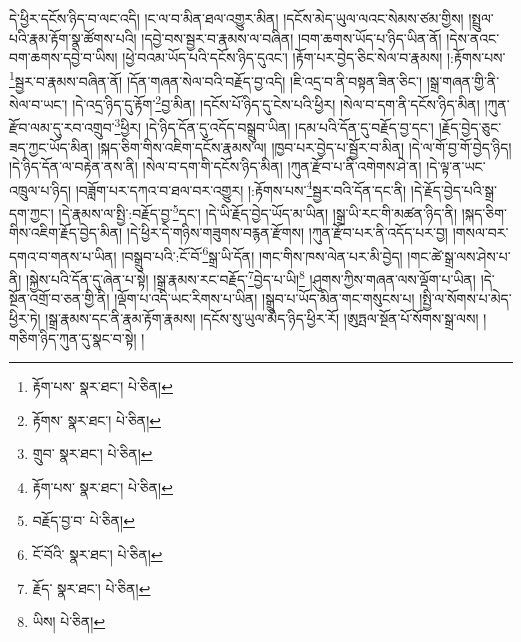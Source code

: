 དེ་ཕྱིར་དངོས་ཉིད་བ་ལང་འདི། །ང་ལ་བ་མིན་ཐལ་འགྱུར་མིན། །དངོས་མེད་ཡུལ་ལའང་སེམས་ཙམ་གྱིས། །སྤྲུལ་པའི་རྣམ་རྟོག་སྣ་ཚོགས་པའི། །དབྱེ་བས་སྦྱར་བ་རྣམས་ལ་བཞིན། །བག་ཆགས་ཡོད་པ་ཉིད་ཡིན་ནོ། །དེས་ནའང་བག་ཆགས་དབྱེ་བ་ཡིས། །ཕྱེ་བའམ་ཡོད་པའི་དངོས་ཉིད་དུའང་། །རྟོག་པར་བྱེད་ཅིང་སེལ་བ་རྣམས། །:རྟོགས་པས་\footnote{རྟོག་པས་  སྣར་ཐང་།  པེ་ཅིན། }སྦྱར་བ་རྣམས་བཞིན་ནོ། །དོན་གཞན་སེལ་བའི་བརྗོད་བྱ་འདི། །ཇི་འདྲ་བ་ནི་བསྟན་ཟིན་ཅིང་། །སྒྲ་གཞན་གྱི་ནི་སེལ་བ་ཡང་། །དེ་འདྲ་ཉིད་དུ་རྟོག་\footnote{རྟོགས་  སྣར་ཐང་།  པེ་ཅིན། }བྱ་མིན། །དངོས་པོ་ཉིད་དུ་ངེས་པའི་ཕྱིར། །སེལ་བ་དག་ནི་དངོས་ཉིད་མིན། །ཀུན་རྫོབ་ལམ་དུ་རབ་འགྲུབ་\footnote{གྲུབ་  སྣར་ཐང་།  པེ་ཅིན། }ཕྱིར། །དེ་ཉིད་དོན་དུ་འདོད་བསྒྲུབ་ཡིན། །དམ་པའི་དོན་དུ་བརྗོད་བྱ་དང་། །རྗོད་བྱེད་ཅུང་ཟད་ཀྱང་ཡོད་མིན། །སྐད་ཅིག་གིས་འཇིག་དངོས་རྣམས་ལ། །ཁྱབ་པར་བྱེད་པ་སྦྱོར་བ་མིན། །དེ་ལ་གོ་བྱ་གོ་བྱེད་ཉིད། །དེ་ཉིད་དོན་ལ་བརྟེན་ནས་ནི། །སེལ་བ་དག་གི་དངོས་ཉིད་མིན། །ཀུན་རྫོབ་པ་ནི་འགེགས་ཤེ་ན། །དེ་ལྟ་ན་ཡང་འཁྲུལ་པ་ཉིད། །བཟློག་པར་དཀའ་བ་ཐལ་བར་འགྱུར། །:རྟོགས་པས་\footnote{རྟོག་པས་  སྣར་ཐང་།  པེ་ཅིན། }སྦྱར་བའི་དོན་དང་ནི། །དེ་རྗོད་བྱེད་པའི་སྒྲ་དག་ཀྱང་། །དེ་རྣམས་ལ་སྤྱི་:བརྗོད་བྱ་\footnote{བརྗོད་བྱ་བ་  པེ་ཅིན། }དང་། །དེ་ཡི་རྗོད་བྱེད་ཡོད་མ་ཡིན། །སྒྲ་ཡི་རང་གི་མཚན་ཉིད་ནི། །སྐད་ཅིག་གིས་འཇིག་རྗོད་བྱེད་མིན། །དེ་ཕྱིར་དེ་གཉིས་གཟུགས་བརྙན་རྫོགས། །ཀུན་རྫོབ་པར་ནི་འདོད་པར་བྱ། །གསལ་བར་དགའ་བ་གནས་པ་ཡིན། །བསྒྲུབ་པའི་:ངོ་བོ་\footnote{ངོ་བོའི་  སྣར་ཐང་།  པེ་ཅིན། }སྒྲ་ཡི་དོན། །གང་གིས་ཁས་ལེན་པར་མི་བྱེད། །གང་ཚེ་སྒྲ་ལས་ཤེས་པ་ནི། །སྐྱེས་པའི་དོན་དུ་ཞེན་པ་སྟེ། །སྒྲ་རྣམས་རང་བརྗོད་\footnote{རྗོད་  སྣར་ཐང་།  པེ་ཅིན། }བྱེད་པ་ཡི།\footnote{ཡིས།  པེ་ཅིན། } །ཤུགས་ཀྱིས་གཞན་ལས་ལྡོག་པ་ཡིན། །དེ་སྔོན་འགྲོ་བ་ཅན་གྱི་ནི། །ལྡོག་པ་འདི་ཡང་རིགས་པ་ཡིན། །སྒྲུབ་པ་ཡོད་མིན་གང་གསུངས་པ། །སྤྱི་ལ་སོགས་པ་མེད་ཕྱིར་ཏེ། །སྒྲ་རྣམས་དང་ནི་རྣམ་རྟོག་རྣམས། །དངོས་སུ་ཡུལ་མེད་ཉིད་ཕྱིར་རོ། །ཨུཏྤལ་སྔོན་པོ་སོགས་སྒྲ་ལས། །གཅིག་ཉིད་ཀུན་དུ་སྣང་བ་སྟེ། །
